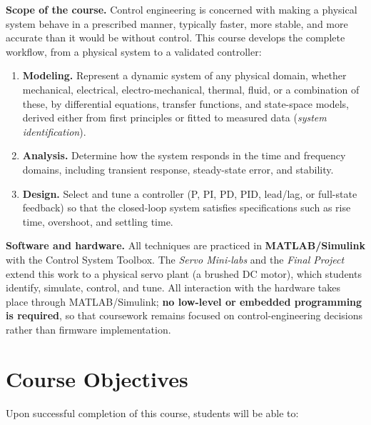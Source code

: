 \documentclass[11pt]{article}
\begin{document}
\textbf{Scope of the course.}
Control engineering is concerned with making a physical system behave in a prescribed
manner, typically faster, more stable, and more accurate than it would be without
control. This course develops the complete workflow, from a physical system to a
validated controller:

\begin{enumerate}
    \item \textbf{Modeling.} Represent a dynamic system of any physical domain, whether
          mechanical, electrical, electro-mechanical, thermal, fluid, or a combination of
          these, by differential equations, transfer functions, and state-space models,
          derived either from first principles or fitted to measured data
          (\emph{system identification}).
    \item \textbf{Analysis.} Determine how the system responds in the time and frequency
          domains, including transient response, steady-state error, and stability.
    \item \textbf{Design.} Select and tune a controller (P, PI, PD, PID, lead/lag, or
          full-state feedback) so that the closed-loop system satisfies specifications
          such as rise time, overshoot, and settling time.
\end{enumerate}

\textbf{Software and hardware.}
All techniques are practiced in \textbf{MATLAB/Simulink} with the Control System
Toolbox. The \emph{Servo Mini-labs} and the \emph{Final Project} extend this work to a
physical servo plant (a brushed DC motor), which students identify, simulate, control,
and tune. All interaction with the hardware takes place through MATLAB/Simulink;
\textbf{no low-level or embedded programming is required}, so that coursework remains
focused on control-engineering decisions rather than firmware implementation.

\section{Course Objectives}
Upon successful completion of this course, students will be able to:
\end{document}
